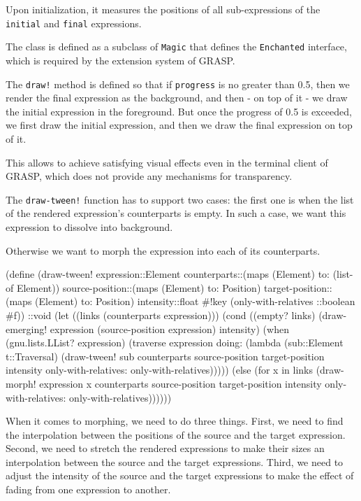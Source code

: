 \documentclass[acmsmall]{acmart}
\newenvironment{Snippet}{\Verbatim[samepage=true]}{\endVerbatim}
\begin{document}
Upon initialization, it measures the positions of all sub-expressions
of the \texttt{initial} and \texttt{final} expressions.

The class is defined as a subclass of \texttt{Magic} that defines the
\texttt{Enchanted} interface, which is required by the extension
system of GRASP.

The \texttt{draw!} method is defined so that if \texttt{progress} is
no greater than 0.5, then we render the final expression as the
background, and then - on top of it - we draw the initial expression
in the foreground.  But once the progress of 0.5 is exceeded, we first
draw the initial expression, and then we draw the final expression on
top of it.

This allows to achieve satisfying visual effects even in the terminal
client of GRASP, which does not provide any mechanisms for
transparency.

The \texttt{draw-tween!} function has to support two cases: the first
one is when the list of the rendered expression's counterparts is
empty. In such a case, we want this expression to dissolve into
background.

Otherwise we want to morph the expression into each of its counterparts.

\begin{Snippet}
(define (draw-tween! expression::Element
		     counterparts::(maps (Element) to: (list-of Element))
		     source-position::(maps (Element) to: Position)
		     target-position::(maps (Element) to: Position)
		     intensity::float
		     #!key (only-with-relatives ::boolean #f))
  ::void
\end{Snippet}
\begin{Snippet}
  (let ((links (counterparts expression)))
    (cond
     ((empty? links)
      (draw-emerging! expression (source-position expression) intensity)
      (when (gnu.lists.LList? expression)
        (traverse
         expression
         doing:
         (lambda (sub::Element t::Traversal)
	   (draw-tween! sub counterparts source-position target-position
	                intensity only-with-relatives: only-with-relatives)))))
\end{Snippet}
\begin{Snippet}
    (else
     (for x in links
       (draw-morph! expression x counterparts source-position target-position
		    intensity only-with-relatives: only-with-relatives))))))
\end{Snippet}

When it comes to morphing, we need to do three things. First, we need
to find the interpolation between the positions of the source and the
target expression. Second, we need to stretch the rendered expressions
to make their sizes an interpolation between the source and the target
expressions.  Third, we need to adjust the intensity of the source and
the target expressions to make the effect of fading from one
expression to another.
\end{document}
